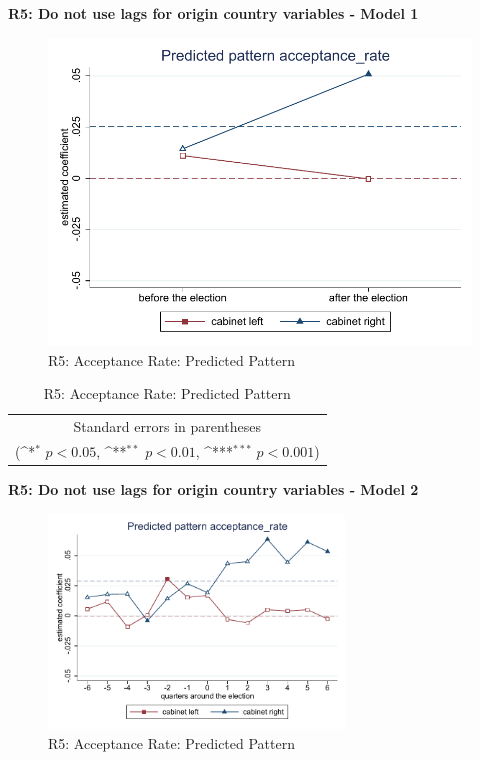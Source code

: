 \documentclass[10pt,a4paper]{scrartcl}
\begin{document}
\clearpage
\textbf{R5: Do not use lags for origin country variables - Model 1}
\begin{figure}[!ht]
	\centering
	\includegraphics[width=1\textwidth]{figures_edited/acceptance_rate_graph1_R5.pdf}
	\caption{R5: Acceptance Rate: Predicted Pattern}
\end{figure}

\begin{table}[!ht]\centering
	\renewcommand{\arraystretch}{1.25}
	\def\sym#1{\ifmmode^{#1}\else\(^{#1}\)\fi}
	\caption{R5: Acceptance Rate: Predicted Pattern}
	\begin{tabular}{l*{2}{c}}
		\hline\hline
		
		\hline\hline
		\multicolumn{3}{c}{\footnotesize Standard errors in parentheses} \\
		\multicolumn{3}{c}{\footnotesize (\sym{*} \(p<0.05\), \sym{**} \(p<0.01\), \sym{***} \(p<0.001\))}\\
	\end{tabular}
\end{table}

\clearpage
\textbf{R5: Do not use lags for origin country variables - Model 2}
\begin{figure}[!ht]
	\centering
	\includegraphics[width=0.7\textwidth]{figures_edited/acceptance_rate_graph2_R5.pdf}
	\caption{R5: Acceptance Rate: Predicted Pattern}
\end{figure}
\end{document}
